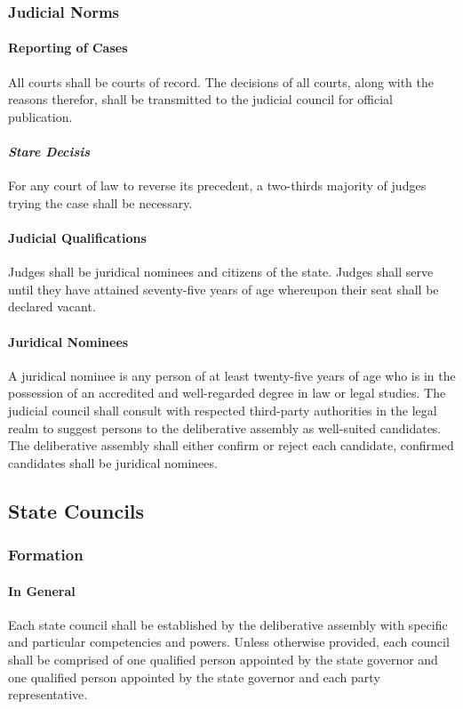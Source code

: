 \documentclass{article}
\begin{document}
\subsubsection{Judicial Norms}
\paragraph{Reporting of Cases}
All courts shall be courts of record. The decisions of all courts, along with the reasons therefor, shall be transmitted to the judicial council for official publication.
\paragraph{\textit{Stare Decisis}}
For any court of law to reverse its precedent, a two-thirds majority of judges trying the case shall be necessary.
\paragraph{Judicial Qualifications}
Judges shall be juridical nominees and citizens of the state. Judges shall serve until they have attained seventy-five years of age whereupon their seat shall be declared vacant.
\paragraph{Juridical Nominees}
A juridical nominee is any person of at least twenty-five years of age who is in the possession of an accredited and well-regarded degree in law or legal studies. The judicial council shall consult with respected third-party authorities in the legal realm to suggest persons to the deliberative assembly as well-suited candidates. The deliberative assembly shall either confirm or reject each candidate, confirmed candidates shall be juridical nominees.
\newpage
\subsection{State Councils}
\subsubsection{Formation}
\paragraph{In General}
Each state council shall be established by the deliberative assembly with specific and particular competencies and powers. Unless otherwise provided, each council shall be comprised of one qualified person appointed by the state governor and one qualified person appointed by the state governor and each party representative. 
\end{document}
